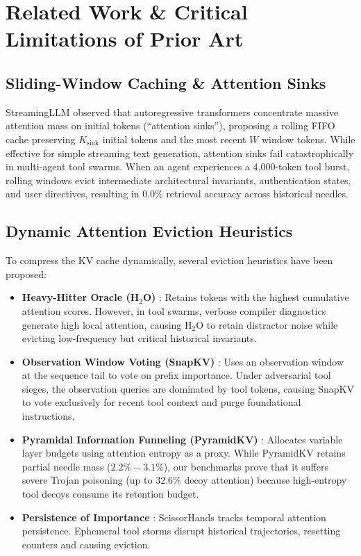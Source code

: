 \documentclass[11pt,letterpaper]{article}
\theoremstyle{definition}
\begin{document}
\section{Related Work \& Critical Limitations of Prior Art}
\label{sec:related}

\subsection{Sliding-Window Caching \& Attention Sinks}
StreamingLLM \cite{xiao2023streamingllm} observed that autoregressive transformers concentrate massive attention mass on initial tokens (``attention sinks''), proposing a rolling FIFO cache preserving $K_{\text{sink}}$ initial tokens and the most recent $W$ window tokens. While effective for simple streaming text generation, attention sinks fail catastrophically in multi-agent tool swarms. When an agent experiences a 4,000-token tool burst, rolling windows evict intermediate architectural invariants, authentication states, and user directives, resulting in $0.0\%$ retrieval accuracy across historical needles.

\subsection{Dynamic Attention Eviction Heuristics}
To compress the KV cache dynamically, several eviction heuristics have been proposed:
\begin{itemize}
    \item \textbf{Heavy-Hitter Oracle (H$_2$O)} \cite{zhang2023h2o}: Retains tokens with the highest cumulative attention scores. However, in tool swarms, verbose compiler diagnostics generate high local attention, causing H$_2$O to retain distractor noise while evicting low-frequency but critical historical invariants.
    \item \textbf{Observation Window Voting (SnapKV)} \cite{li2024snapkv}: Uses an observation window at the sequence tail to vote on prefix importance. Under adversarial tool sieges, the observation queries are dominated by tool tokens, causing SnapKV to vote exclusively for recent tool context and purge foundational instructions.
    \item \textbf{Pyramidal Information Funneling (PyramidKV)} \cite{cai2024pyramidkv}: Allocates variable layer budgets using attention entropy as a proxy. While PyramidKV retains partial needle mass ($2.2\%-3.1\%$), our benchmarks prove that it suffers severe Trojan poisoning (up to $32.6\%$ decoy attention) because high-entropy tool decoys consume its retention budget.
    \item \textbf{Persistence of Importance} \cite{liu2023scissorhands}: ScissorHands tracks temporal attention persistence. Ephemeral tool storms disrupt historical trajectories, resetting counters and causing eviction.
\end{itemize}
\end{document}

